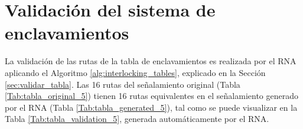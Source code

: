 \section{Validación del sistema de enclavamientos}

    La validación de las rutas de la tabla de enclavamientos es realizada por el RNA aplicando el Algoritmo \ref{alg:interlocking_tables}, explicado en la Sección \ref{sec:validar_tabla}. Las 16 rutas del señalamiento original (Tabla \ref{Tab:tabla_original_5}) tienen 16 rutas equivalentes en el señalamiento generado por el RNA (Tabla \ref{Tab:tabla_generated_5}), tal como se puede visualizar en la Tabla \ref{Tab:tabla_validation_5}, generada automáticamente por el RNA.

    \begin{table}[H]
        {
        \caption{Equivalencias entre las rutas originales y las generadas por el RNA.}
        \label{Tab:tabla_validation_5}
        \begin{center}
\end{center}}
\end{table}

